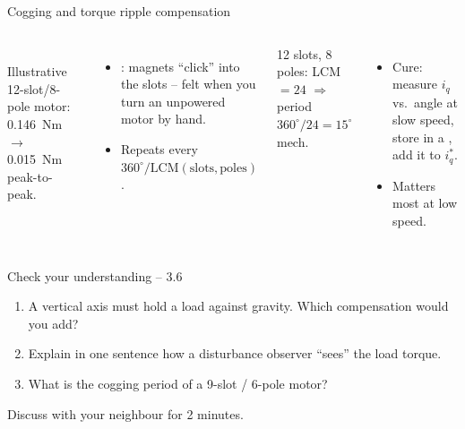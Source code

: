 \documentclass[aspectratio=169,10pt]{beamer}
\begin{document}
\begin{frame}[t]{Cogging and torque ripple compensation}
\begin{columns}[T,onlytextwidth]
\\
\scriptsize Illustrative 12-slot/8-pole motor: \SI{0.146}{Nm} $\to$ \SI{0.015}{Nm} peak-to-peak.
\begin{itemize}\small
\item {}: magnets ``click'' into the slots -- felt when you turn an unpowered motor by hand.
\item Repeats every $360^\circ/\text{LCM}(\text{slots},\text{poles})$.
\end{itemize}
\begin{defbox}[Example]
\small 12 slots, 8 poles: LCM $=24$ $\Rightarrow$ period $360^\circ/24=15^\circ$ mech.
\end{defbox}
\begin{itemize}\small
\item Cure: measure $i_q$ vs.\ angle at slow speed, store in a , add it to $i_q^*$.
\item Matters most at low speed.
\end{itemize}
\end{columns}
\end{frame}

\begin{frame}[t]{Check your understanding -- 3.6}
\vspace{4mm}
\begin{keybox}
\large
\begin{enumerate}
\item A vertical axis must hold a load against gravity. Which compensation would you add?\\[3mm]
\item Explain in one sentence how a disturbance observer ``sees'' the load torque.\\[3mm]
\item What is the cogging period of a 9-slot / 6-pole motor?
\end{enumerate}
\end{keybox}
\vfill
\centering\small\color{mkGray} Discuss with your neighbour for 2 minutes.
\end{frame}
\end{document}
